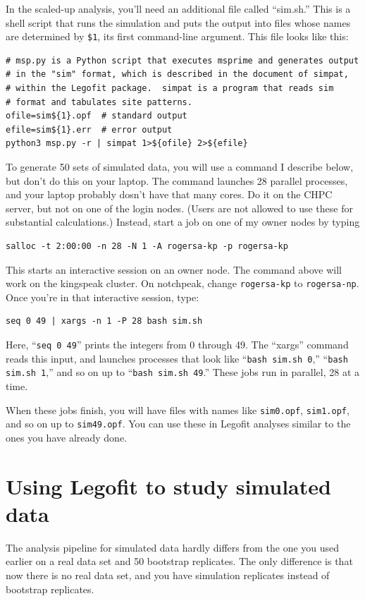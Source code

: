 \documentclass[11pt]{article}
\begin{document}
In the scaled-up analysis, you'll need an additional file called
``sim.sh.'' This is a shell script that runs the simulation and puts
the output into files whose names are determined by \verb|$1|, its
first command-line argument. This file looks like this:
\begin{verbatim}
# msp.py is a Python script that executes msprime and generates output
# in the "sim" format, which is described in the document of simpat,
# within the Legofit package.  simpat is a program that reads sim
# format and tabulates site patterns.
ofile=sim${1}.opf  # standard output
efile=sim${1}.err  # error output
python3 msp.py -r | simpat 1>${ofile} 2>${efile}
\end{verbatim}
To generate 50 sets of simulated data, you will use a command I
describe below, but don't do this on your laptop. The command launches
28 parallel processes, and your laptop probably dosn't have that many
cores. Do it on the CHPC server, but not on one of the login
nodes. (Users are not allowed to use these for substantial
calculations.) Instead, start a job on one of my owner nodes by typing
\begin{verbatim}
salloc -t 2:00:00 -n 28 -N 1 -A rogersa-kp -p rogersa-kp
\end{verbatim}
This starts an interactive session on an owner node. The command above
will work on the kingspeak cluster. On notchpeak, change
\texttt{rogersa-kp} to \texttt{rogersa-np}. Once you're in that
interactive session, type:
\begin{verbatim}
seq 0 49 | xargs -n 1 -P 28 bash sim.sh
\end{verbatim}
Here, ``\texttt{seq 0 49}'' prints the integers from 0 through 49. The
``xargs'' command reads this input, and launches processes that look
like ``\texttt{bash sim.sh 0},'' ``\texttt{bash sim.sh 1},'' and so on
up to ``\texttt{bash sim.sh 49}.'' These jobs run in parallel, 28 at a
time.

When these jobs finish, you will have files with names like
\texttt{sim0.opf}, \texttt{sim1.opf}, and so on up to
\texttt{sim49.opf}. You can use these in Legofit analyses similar to
the ones you have already done.

\section{Using Legofit to study simulated data}

The analysis pipeline for simulated data hardly differs from the one
you used earlier on a real data set and 50 bootstrap replicates. The
only difference is that now there is no real data set, and you have 
simulation replicates instead of bootstrap replicates.
\end{document}
